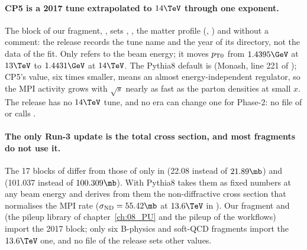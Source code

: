 \paragraph{CP5 is a 2017 tune extrapolated to $14\TeV$ through one exponent.}
The block of our fragment, , sets
, , the matter profile (,
) and  without a comment: the release records the tune
name and the year of its directory, not the data of the fit. Only  refers to the beam energy; it moves
$p_{\mathrm{T}0}$ from $1.4395\GeV$ at $13\TeV$ to $1.4431\GeV$ at $14\TeV$. The Pythia8 default is 
(Monash, line 221 of ); CP5's value, six times smaller, means an almost
energy-independent regulator, so the MPI activity grows with $\sqrt s$ nearly as fast as the parton densities at
small $x$. The release has no $14\TeV$ tune, and no era can change one for Phase-2: no file of
 or  calls .

\paragraph{The only Run-3 update is the total cross section, and most fragments do not use it.}
The 17 blocks of  differ from those of  only in
 (22.08 instead of $21.89\mb$) and  (101.037 instead of
$100.309\mb$). With  Pythia8 takes them as fixed numbers at any beam energy and derives
from them the non-diffractive cross section that normalises the MPI rate ($\sigma_{\mathrm{ND}}=55.42\mb$ at
$13.6\TeV$ in ). Our fragment and  (the
pileup library of chapter~\ref{ch:08_PU} and the  pileup of the  workflows)
import the 2017 block; only six B-physics and soft-QCD fragments import the $13.6\TeV$ one, and no file of the
release sets other values.

